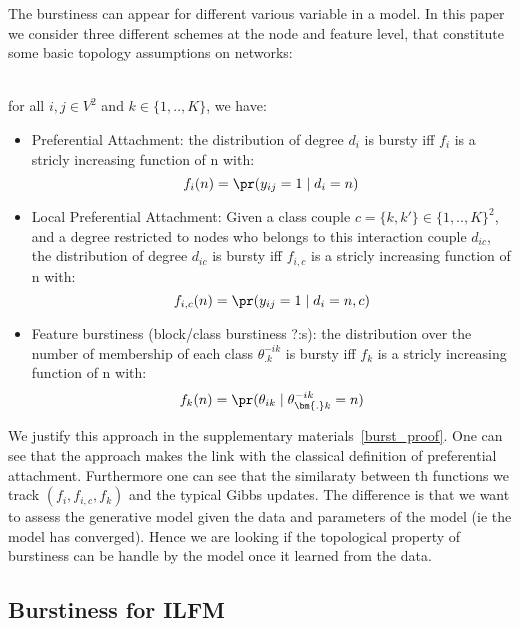 The burstiness can appear for different various variable in a model. In this paper we consider three different schemes at the node and feature level, that constitute some basic topology assumptions on networks:

\begin{proposition}~\\
for all $i,j \in V^2$ and $k \in \{1,.., K\}$, we have:
\begin{itemize}
	\item Preferential Attachment: the distribution of degree $d_i$ is bursty iff $f_i$ is a stricly increasing function of n with: $$f_i(n)=\pr(y_{ij}=1 \mid d_i=n)$$
	\item Local Preferential Attachment: Given a class couple $c= \{k, k'\} \in \{1,..,K\}^2$, and a degree restricted to nodes who belongs to this interaction couple $d_{ic}$, the distribution of degree $d_{ic}$ is bursty iff $f_{i,c}$ is a stricly increasing function of n with: $$f_{i,c}(n)=\pr(y_{ij}=1 \mid d_i=n, c)$$
	\item Feature burstiness (block/class burstiness ?:s): the distribution over the number of membership of each class $\theta_{\bm{.}k}^{-ik}$ is bursty iff  $f_k$  is a stricly increasing function of n with: $$f_k(n) = \pr(\theta_{ik} \mid \theta_{\bm{.}k}^{-ik}=n)$$ 
\end{itemize}
\end{proposition}

We justify this approach in the supplementary materials~\ref{burst_proof}. One can see that the approach makes the link with the classical definition of preferential attachment. Furthermore one can see that the similaraty between th functions we track $(f_i, f_{i,c}, f_k)$ and the typical Gibbs updates. The difference is that we want to assess the generative model given the data and parameters of the model (ie the model has converged). Hence we are looking if the topological property of burstiness can be handle by the model once it learned from the data.~\\



\subsection{Burstiness for ILFM}

